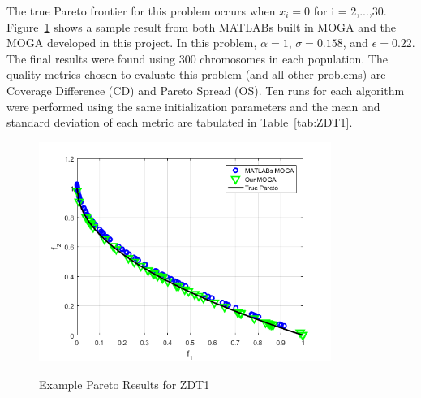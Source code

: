 \documentclass{article}
\begin{document}
\noindent The true Pareto frontier for this problem occurs when $x_i = 0$ for i = 2,...,30. Figure~\ref{fig:ZDT1} shows a sample result from both MATLABs built in MOGA and the MOGA developed in this project. In this problem, $\alpha=1$, $\sigma = 0.158$, and $\epsilon = 0.22$. The final results were found using 300 chromosomes in each population. The quality metrics chosen to evaluate this problem (and all other problems) are Coverage Difference (CD) and Pareto Spread (OS). Ten runs for each algorithm were performed using the same initialization parameters and the mean and standard deviation of each metric are tabulated in Table~\ref{tab:ZDT1}.


\begin{figure}[h]
  \caption{Example Pareto Results for ZDT1}
  \centering
  \includegraphics[width=0.85\textwidth]{ZDT1_pareto_final.png}  
  \label{fig:ZDT1}
\end{figure}
\end{document}
